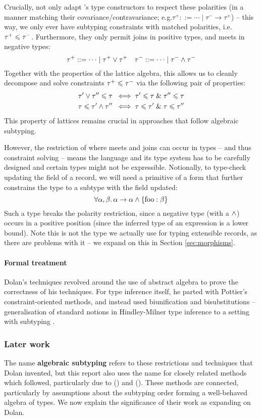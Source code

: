 Crucially, \textcite{mlsub} not only adapt \mlsub{}'s type constructors to respect these polarities (in a manner matching their covariance/contravariance; e.g.\@ $\tau^+ ::= \cdots \mid \tau^- \to \tau^+$) -- this way, we only ever have subtyping constraints with matched polarities, i.e.\@ $\tau^+ \leqslant \tau^-$. Furthermore, they only permit joins in positive types, and meets in negative types:
$$ \tau^+ ::= \cdots \mid \tau^+ \lor \tau^+ \quad \tau^- ::= \cdots \mid \tau^- \land \tau^- $$
Together with the properties of the lattice algebra, this allows us to cleanly decompose and solve constraints $\tau^+ \leqslant \tau^-$ via the following pair of properties:
\begin{align*}
\tau' \lor \tau'' \leqslant \tau \;&\iff \tau' \leqslant \tau \;\&\; \tau'' \leqslant \tau \\
\tau \leqslant \tau' \land \tau'' \;&\iff \tau \leqslant \tau' \;\&\; \tau \leqslant \tau'' 
\end{align*}
This property of lattices remains crucial in approaches that follow algebraic subtyping.

However, the restriction of where meets and joins can occur in types -- and thus constraint solving -- means the language and its type system has to be carefully designed and certain types might not be expressible. 
Notionally, to type-check updating the field of a record, we will need a primitive of a form that further constrains the type to a subtype with the field updated:
$$ \forall \alpha, \beta \ldotp \alpha \to \alpha \land \flrec{\mathrm{foo}: \beta}  $$
Such a type breaks the polarity restriction, since a negative type (with a $\land$) occurs in a positive position (since the inferred type of an expression is a lower bound).
Note this is not the type we actually use for typing extensible records, as there are problems with it -- we expand on this in Section \ref{sec:morphisms}.

\paragraph{Formal treatment} Dolan's techniques revolved around the use of abstract algebra to prove the correctness of his techniques. For type inference itself, he parted with Pottier's constraint-oriented methods, and instead used biunification and bisubstitutions -- generalisation of standard notions in Hindley-Milner type inference to a setting with subtyping \cite{tapl, dolan-thesis}. 

\subsubsection{Later work}
The name \textbf{algebraic subtyping} refers to these restrictions and techniques that Dolan invented, but this report also uses the name for closely related methods which followed, particularly due to \textcite{simple-sub} (\simplesub{}) and \textcite{mlstruct} (\mlstruct{}). These methods are connected, particularly by assumptions about the subtyping order forming a well-behaved algebra of types. We now explain the significance of their work as expanding on Dolan.

